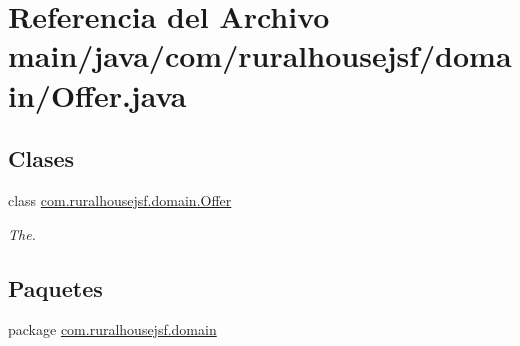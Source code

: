 \hypertarget{a00044}{}\section{Referencia del Archivo main/java/com/ruralhousejsf/domain/\+Offer.java}
\label{a00044}
\subsection*{Clases}
\begin{DoxyCompactItemize}
\item 
class \mbox{\hyperlink{a00184}{com.\+ruralhousejsf.\+domain.\+Offer}}
\begin{DoxyCompactList}\small\item\em The. \end{DoxyCompactList}\end{DoxyCompactItemize}
\subsection*{Paquetes}
\begin{DoxyCompactItemize}
\item 
package \mbox{\hyperlink{a00114}{com.\+ruralhousejsf.\+domain}}
\end{DoxyCompactItemize}
